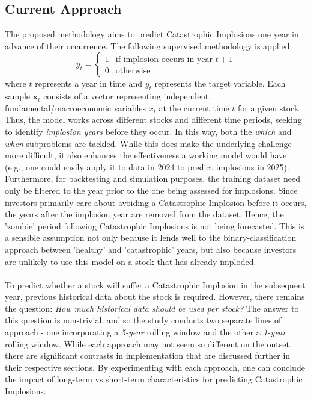 \documentclass[a4paper]{report}
\begin{document}
\subsection{Current Approach}
The proposed methodology aims to predict Catastrophic Implosions one year in advance of their occurrence. The following supervised methodology is applied:
\begin{equation}
  y_t = \begin{cases} 
  1 & \text{if implosion occurs in year } t+1 \\
  0 & \text{otherwise}
\end{cases}
\end{equation}
where \(t\) represents a year in time and \(y_t\) represents the target variable. Each sample
\(\mathbf{x}_t\) consists of a vector representing independent, fundamental/macroeconomic variables \(x_i\) at the current time \(t\) for a given stock. Thus, the model works across different stocks 
and different time periods, seeking to identify \textit{implosion years} before they occur. In this way, both the \textit{which} and \textit{when} subproblems are tackled. While 
this does make the underlying challenge more difficult, it also enhances the effectiveness a working model would have (e.g., one could easily apply it to data in 2024 to predict implosions in 2025). Furthermore, for backtesting and simulation
purposes, the training dataset need only be filtered to the year prior to the one being assessed for implosions. Since investors primarily care about avoiding a Catastrophic Implosion before it occurs, the years after the implosion year 
are removed from the dataset. Hence, the 'zombie' period following Catastrophic Implosions is not being forecasted. This is a sensible assumption not only because it lends well to the binary-classification approach between 'healthy' and 'catastrophic' 
years, but also because investors are unlikely to use this model on a stock that has already imploded. \\\\To predict whether a stock will suffer a Catastrophic Implosion in the subsequent year, 
previous historical data about the stock is required. However, there remains the question: \textit{How much historical data should be used per stock?} The answer 
to this question is non-trivial, and so the study conducts two separate lines of approach - one incorporating a \textit{5-year} rolling window and the other a \textit{1-year} rolling window. While 
each approach may not seem so different on the outset, there are significant contrasts in implementation that are discussed further in their respective sections. By experimenting with each approach, one can conclude 
the impact of long-term vs short-term characteristics for predicting Catastrophic Implosions.
\end{document}
